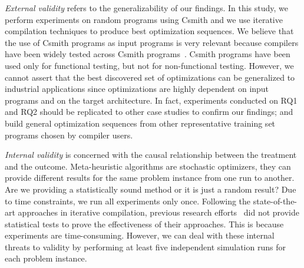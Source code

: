 		\textit{External validity} refers to the generalizability of our findings. In this study, we perform experiments on random programs using Csmith and we use iterative compilation techniques to produce best optimization sequences. We believe that the use of Csmith programs as input programs is very relevant because compilers have been widely tested across Csmith programs~\cite{chen2016empirical,yang2011finding}. Csmith programs have been used only for functional testing, but not for non-functional testing. However, we cannot assert that the best discovered set of optimizations can be generalized to industrial applications since optimizations are highly dependent on input programs and on the target architecture. In fact, experiments conducted on RQ1 and RQ2 should be replicated to other case studies to confirm our findings; and build general optimization sequences from other representative training set programs chosen by compiler users.
		
		\textit{Internal validity} is concerned with the causal relationship between the treatment and the outcome. Meta-heuristic algorithms are stochastic optimizers, they can provide different results for the same problem instance from one run to another. Are we providing a statistically sound method or it is just a random result? Due to time constraints, we run all experiments only once. Following the state-of-the-art approaches in iterative compilation, previous research efforts~\cite{hoste2008cole,martinez2014multi} did not provide statistical tests to prove the effectiveness of their approaches. This is because experiments are time-consuming. However, we can deal with these internal threats to validity by performing at least five independent simulation runs for each problem instance. 
		
